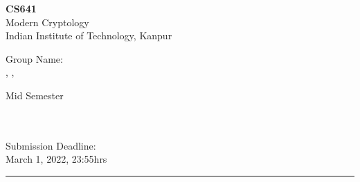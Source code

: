 \newcommand{\courseNumb}{CS641}
\newcommand{\courseName}{Modern Cryptology}
\newcommand{\subDate}{March 1, 2022, 23:55hrs}

\begin{minipage}[t]{0.50\linewidth}
    \begin{flushleft}
        {\huge \textbf{\courseNumb}}\\
        {\large \courseName}\\
        {\normalsize Indian Institute of Technology, Kanpur}\\
        \rule{0mm}{8mm}%
        {\large  Group Name: \GroupNum}\\
        {\normalsize \MembAName, \MembBName, \MembCName}
    \end{flushleft}

\end{minipage}
\hfill
\begin{minipage}[t]{0.40\linewidth}
    \centering
        {\huge Mid Semester}\\ \rule{0mm}{10mm} \scalebox{2}{Examination}\\~\\
        Submission Deadline: \\ \subDate

\end{minipage}

\rule{0mm}{0.5mm}%

{\centering \rule{0.99\linewidth}{1pt} }